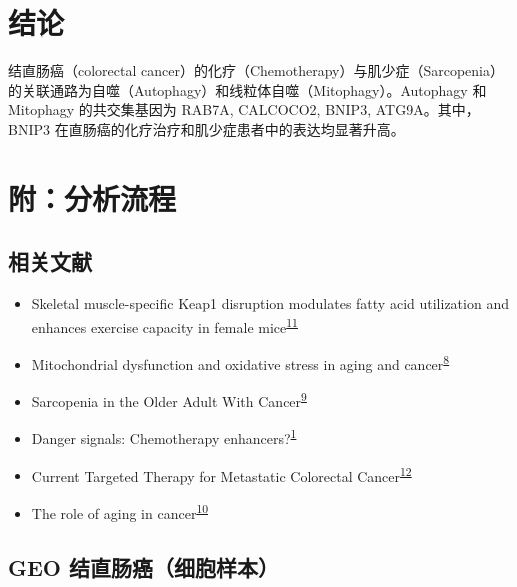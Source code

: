 \documentclass[
]{article}
\providecommand{\tightlist}{%
  \setlength{\itemsep}{0pt}\setlength{\parskip}{0pt}}
\begin{document}
\hypertarget{dis}{%
\section{结论}\label{dis}}

结直肠癌（colorectal cancer）的化疗（Chemotherapy）与肌少症（Sarcopenia）的关联通路为自噬（Autophagy）和线粒体自噬（Mitophagy）。Autophagy 和 Mitophagy 的共交集基因为 RAB7A, CALCOCO2, BNIP3, ATG9A。其中，BNIP3 在直肠癌的化疗治疗和肌少症患者中的表达均显著升高。

\hypertarget{supp}{%
\section{附：分析流程}\label{supp}}

\hypertarget{ux76f8ux5173ux6587ux732e}{%
\subsection{相关文献}\label{ux76f8ux5173ux6587ux732e}}

\begin{itemize}
\tightlist
\item
  Skeletal muscle-specific Keap1 disruption modulates fatty acid utilization and enhances exercise capacity in female mice\textsuperscript{\protect\hyperlink{ref-SkeletalMuscleOnoki2021}{11}}
\item
  Mitochondrial dysfunction and oxidative stress in aging and cancer\textsuperscript{\protect\hyperlink{ref-MitochondrialDKudrya2016}{8}}
\item
  Sarcopenia in the Older Adult With Cancer\textsuperscript{\protect\hyperlink{ref-SarcopeniaInTWillia2021}{9}}
\item
  Danger signals: Chemotherapy enhancers?\textsuperscript{\protect\hyperlink{ref-DangerSignalsVargas2017}{1}}
\item
  Current Targeted Therapy for Metastatic Colorectal Cancer\textsuperscript{\protect\hyperlink{ref-CurrentTargeteOhishi2023}{12}}
\item
  The role of aging in cancer\textsuperscript{\protect\hyperlink{ref-TheRoleOfAgiHavas2022}{10}}
\end{itemize}

\hypertarget{geo-ux7ed3ux76f4ux80a0ux764cux7ec6ux80deux6837ux672c}{%
\subsection{GEO 结直肠癌（细胞样本）}\label{geo-ux7ed3ux76f4ux80a0ux764cux7ec6ux80deux6837ux672c}}
\end{document}
